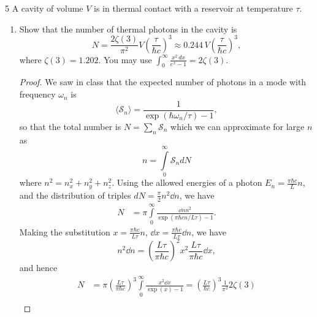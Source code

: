 \documentclass[11pt]{article}
\begin{document}
\begin{problem}{5}
A cavity of volume \( V \) is in thermal contact with a reservoir at temperature \( \tau \).
\begin{enumerate}[label=(\alph*)]
  \item Show that the number of thermal photons in the cavity is
  \begin{equation}
    \label{eq:p5-photon-number}
    N = \frac{2\zeta(3)}{\pi^2}V\left(\frac{\tau}{\hbar c}\right)^3
    \approx 0.244\,V\left(\frac{\tau}{\hbar c}\right)^3,
  \end{equation}
  where \( \zeta(3) = 1.202 \).
  You may use \( \displaystyle\int_0^{\infty}\frac{x^2\,dx}{e^x-1} = 2\zeta(3) \).
        \begin{proof}
          We saw in class that the expected number of photons in a mode with frequency \(\omega_n\) is
          \begin{equation}
          \label{eq:3}
          \langle \mathcal{S}_n \rangle = \frac{1}{\exp(\hbar \omega_n/\tau) - 1},
        \end{equation}
        so that the total number is \( N = \sum\limits_n \mathcal{S}_n \) which we can approximate for large \( n \) as
        \begin{equation}
        \label{eq:4}
        n = \int\limits_{0}^{\infty} \mathcal{S}_n dN
        \end{equation}
        where \( n^2 = n_x^2 + n_y^2 + n_z^2 \).
        Using the allowed energies of a photon \( E_n = \frac{\pi\hbar c}{L}n \), and the distribution of triples \( dN = \frac{\pi}{2} n^2 \dd{n} \), we have
        \begin{equation}
        \label{eq:9}
        \begin{aligned}
        N &= \pi \int\limits_0^{\infty}  \frac{\dd{n}n^2}{\exp(\pi\hbar c n/L\tau) - 1}.
        \end{aligned}
      \end{equation}
      Making the substitution \( x = \frac{\pi\hbar c}{L\tau}n \), \( \dd{x} = \frac{\pi\hbar c}{L\tau} \dd{n} \), we have
      \begin{equation}
      \label{eq:10}
      n^2 \dd{n} = \left( \frac{L\tau}{\pi\hbar c} \right)^2 x^2 \frac{L\tau}{\pi\hbar c} \dd{x},
    \end{equation}
    and hence
    \begin{equation}
    \label{eq:11}
    \begin{aligned}
      N &= \pi \left( \frac{L\tau}{\pi\hbar c} \right)^3 \int\limits_{0}^{\infty} \frac{x^2 \dd{x}}{\exp(x) - 1} = \left( \frac{L\tau}{\hbar c} \right)^3 \frac{1}{\pi^2} 2\zeta(3) \\

\end{aligned}
\end{equation}
\end{proof}
\end{enumerate}
\end{problem}
\end{document}
